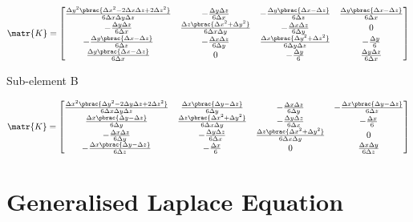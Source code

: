 \begin{equation}
  \matr{K}=\begin{bmatrix}
  \frac{{\Delta y}^{2}\pbrac{{\Delta x}^{2}-2\Delta x\Delta z+2{\Delta z}^{2}}}{6\Delta x\Delta y\Delta z} & -\frac{\Delta y\Delta z}{6\Delta x} &
  -\frac{\Delta y\pbrac{\Delta x - \Delta z}}{6\Delta z} & \frac{\Delta y\pbrac{\Delta x - \Delta z}}{6\Delta x} \\
  -\frac{\Delta y\Delta z}{6\Delta x} & \frac{\Delta z\pbrac{{\Delta x}^{2}+{\Delta y}^{2}}}{6\Delta x\Delta y} &
  -\frac{\Delta x\Delta z}{6\Delta y} & 0 \\
  -\frac{\Delta y\pbrac{\Delta x - \Delta z}}{6\Delta z} & -\frac{\Delta x\Delta z}{6\Delta y} &
  \frac{\Delta x\pbrac{{\Delta y}^{2}+{\Delta z}^{2}}}{6\Delta y\Delta z} & -\frac{\Delta y}{6} \\
  \frac{\Delta y\pbrac{\Delta x - \Delta z}}{6\Delta x} & 0 &
  -\frac{\Delta y}{6} & \frac{\Delta y\Delta z}{6\Delta x}
  \end{bmatrix}
\end{equation} 

Sub-element B

\begin{equation}
  \matr{K}=\begin{bmatrix}
  \frac{{\Delta x}^{2}\pbrac{{\Delta y}^{2}-2\Delta y\Delta z+2{\Delta z}^{2}}}{6\Delta x\Delta y\Delta z} & \frac{\Delta x\pbrac{\Delta y-\Delta z}}{6\Delta y} &
  -\frac{\Delta x\Delta z}{6\Delta y} & -\frac{\Delta x\pbrac{\Delta y - \Delta z}}{6\Delta z} \\
  \frac{\Delta x\pbrac{\Delta y-\Delta z}}{6\Delta y} & \frac{\Delta z\pbrac{{\Delta x}^{2}+{\Delta y}^{2}}}{6\Delta x\Delta y} &
  -\frac{\Delta y\Delta z}{6\Delta x} & -\frac{\Delta x}{6} \\
  -\frac{\Delta x\Delta z}{6\Delta y} & -\frac{\Delta y\Delta z}{6\Delta x} &
  \frac{\Delta z\pbrac{{\Delta x}^{2}+{\Delta y}^{2}}}{6\Delta x\Delta y} & 0 \\
  -\frac{\Delta x\pbrac{\Delta y - \Delta z}}{6\Delta z} & -\frac{\Delta x}{6} &
  0 & \frac{\Delta x\Delta y}{6\Delta z}
  \end{bmatrix}
\end{equation} 

\section{Generalised Laplace Equation}
\label{sec:ElementStiffnessMatrixGenLaplace}

